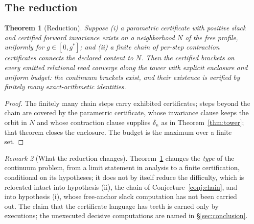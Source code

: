 \documentclass[11pt]{article}
\newtheorem{theorem}{Theorem}[section]
\theoremstyle{definition}
\theoremstyle{remark}
\newtheorem{remark}[theorem]{Remark}
\begin{document}
\subsection{The reduction}
\begin{theorem}[Reduction]\label{thm:reduction}
Suppose (i) a parametric certificate with positive slack and certified
forward invariance exists on a neighborhood $N$ of the free profile,
uniformly for $g \in [0, g^*]$; and (ii) a finite chain of per-step
contraction certificates connects the declared content to $N$.  Then the
certified brackets on every emitted relational read converge along the
tower with explicit enclosure and uniform budget: the continuum brackets
exist, and their existence is verified by finitely many exact-arithmetic
identities.
\end{theorem}
\begin{proof}
The finitely many chain steps carry exhibited certificates; steps beyond
the chain are covered by the parametric certificate, whose invariance
clause keeps the orbit in $N$ and whose contraction clause supplies
$\delta_n$ as in Theorem~\ref{thm:tower}; that theorem closes the
enclosure.  The budget is the maximum over a finite set.
\end{proof}

\begin{remark}[What the reduction changes]\label{rem:teeth}
Theorem~\ref{thm:reduction} changes the \emph{type} of the continuum
problem, from a limit statement in analysis to a finite certification,
conditional on its hypotheses; it does not by itself reduce the
difficulty, which is relocated intact into hypothesis (ii), the chain
of Conjecture~\ref{conj:chain}, and into hypothesis (i), whose
free-anchor slack computation has not been carried out.  The claim that
the certificate language has teeth is earned only by executions; the
unexecuted decisive computations are named in \S\ref{sec:conclusion}.
\end{remark}
\end{document}
